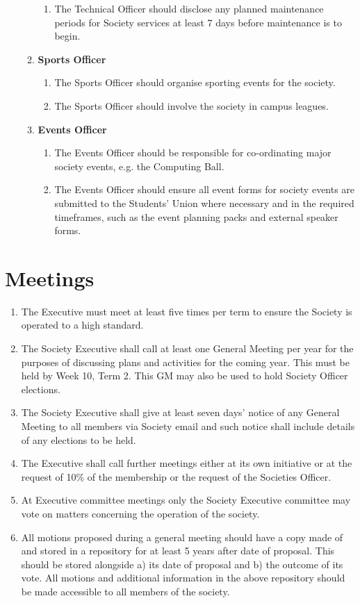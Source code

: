 \documentclass{article}
\begin{document}
\begin{enumerate}
\begin{enumerate}
\begin{enumerate}
            \item The Technical Officer should disclose any planned maintenance periods for Society services at least 7 days before maintenance is to begin.
        \end{enumerate}
        \item \textbf{Sports Officer}
        \begin{enumerate}
            \item The Sports Officer should organise sporting events for the society.
            \item The Sports Officer should involve the society in campus leagues.
        \end{enumerate}
        \item \textbf{Events Officer}
        \begin{enumerate}
            \item The Events Officer should be responsible for co-ordinating major society events, e.g. the Computing Ball.
            \item The Events Officer should ensure all event forms for society events are submitted to the Students' Union where necessary and in the required timeframes, such as the event planning packs and external speaker forms.
        \end{enumerate}
    \end{enumerate}
\end{enumerate}

\section{Meetings}
\begin{enumerate}
    \item The Executive must meet at least five times per term to ensure the Society is operated to a high standard.
    \item The Society Executive shall call at least one General Meeting per year for the purposes of discussing plans and activities for the coming year. This must be held by Week 10, Term 2. This GM may also be used to hold Society Officer elections.
    \item The Society Executive shall give at least seven days' notice of any General Meeting to all members via Society email and such notice shall include details of any elections to be held.
    \item The Executive shall call further meetings either at its own initiative or at the request of 10\% of the membership or the request of the Societies Officer.
    \item At Executive committee meetings only the Society Executive committee may vote on matters concerning the operation of the society.
    \item All motions proposed during a general meeting should have a copy made of and stored in a repository for at least 5 years after date of proposal. This should be stored alongside a) its date of proposal and b) the outcome of its vote. All motions and additional information in the above repository should be made accessible to all members of the society.
\end{enumerate}
\end{document}
